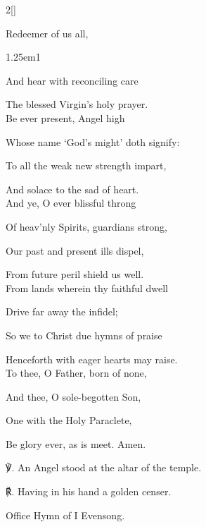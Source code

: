 \begin{paracol}{2}[]
\mattinsOfficeHymn

 Redeemer of us all,

\begin{hangparas}{1.25em}{1}

And hear with reconciling care

The blessed Virgin's holy prayer.\\

Be ever present, Angel high

Whose name `God's might' doth signify:

To all the weak new strength impart,

And solace to the sad of heart.\\

And ye, O ever blissful throng

Of heav'nly Spirits, guardians strong,

Our past and present ills dispel,

From future peril shield us well.\\

From lands wherein thy faithful dwell

Drive far away the infidel;

So we to Christ due hymns of praise

Henceforth with eager hearts may raise.\\

To thee, O Father, born of none,

And thee, O sole-begotten Son,

One with the Holy Paraclete,

Be glory ever, as is meet. Amen.\\
\end{hangparas}

    ℣. An Angel stood at the altar of the temple.

	℟. Having in his hand a golden censer.
	

\fussy
\end{paracol}

\clearpage
\secondEvensong

\begin{rubric}
	Office Hymn of I Evensong.
\end{rubric}

